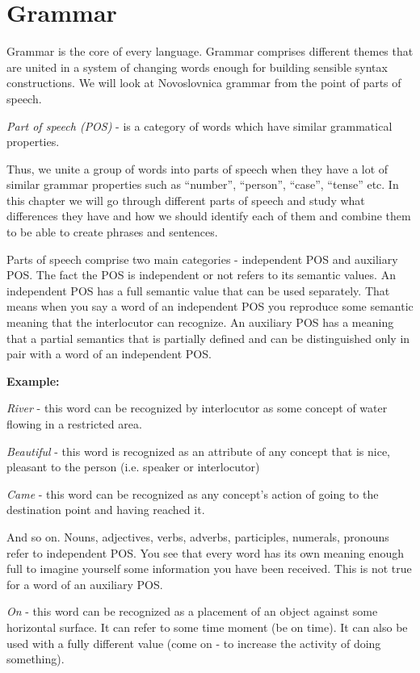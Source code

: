 \chapter{Grammar}

Grammar is the core of every language. Grammar comprises different themes that are united in a system of changing words enough for building sensible syntax constructions. We will look at Novoslovnica grammar from the point of parts of speech.

\textit{Part of speech (POS)} - is a category of words which have similar grammatical properties.

Thus, we unite a group of words into parts of speech when they have a lot of similar grammar properties such as “number”, “person”, “case”, “tense” etc. In this chapter we will go through different parts of speech and study what differences they have and how we should identify each of them and combine them to be able to create phrases and sentences. 

Parts of speech comprise two main categories - independent POS and auxiliary POS. The fact the POS is independent or not refers to its semantic values. An independent POS has a full semantic value that can be used separately.  That means when you say a word of an independent POS you reproduce some semantic meaning that the interlocutor can recognize. An auxiliary POS has a meaning that a partial semantics that is partially defined and can be distinguished only in pair with a word of an independent POS.

\textbf{Example:}

\textit{River} - this word can be recognized by interlocutor as some concept of water flowing in a restricted area.

\textit{Beautiful} - this word is recognized as an attribute of any concept that is nice, pleasant to the person (i.e. speaker or interlocutor)

\textit{Came} - this word can be recognized as any concept’s action of going to the destination point and having reached it. 

And so on. Nouns, adjectives, verbs, adverbs, participles, numerals, pronouns refer to independent POS. You see that every word has its own meaning enough full to imagine yourself some information you have been received. This is not true for a word of an auxiliary POS. 

\textit{On} - this word can be recognized as a placement of an object against some horizontal surface. It can refer to some time moment (be on time). It can also be used with a fully different value (come on - to increase the activity of doing something).

